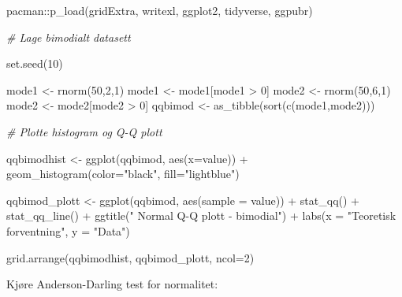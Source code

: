 \documentclass[
]{book}
\newenvironment{Shaded}{\begin{snugshade}}{\end{snugshade}}
\newcommand{\AttributeTok}[1]{\textcolor[rgb]{0.77,0.63,0.00}{#1}}
\newcommand{\CommentTok}[1]{\textcolor[rgb]{0.56,0.35,0.01}{\textit{#1}}}
\newcommand{\DecValTok}[1]{\textcolor[rgb]{0.00,0.00,0.81}{#1}}
\newcommand{\FunctionTok}[1]{\textcolor[rgb]{0.00,0.00,0.00}{#1}}
\newcommand{\NormalTok}[1]{#1}
\newcommand{\OtherTok}[1]{\textcolor[rgb]{0.56,0.35,0.01}{#1}}
\newcommand{\SpecialCharTok}[1]{\textcolor[rgb]{0.00,0.00,0.00}{#1}}
\newcommand{\StringTok}[1]{\textcolor[rgb]{0.31,0.60,0.02}{#1}}
\begin{document}
\begin{Shaded}
\begin{Highlighting}[]
\NormalTok{pacman}\SpecialCharTok{::}\FunctionTok{p\_load}\NormalTok{(gridExtra, writexl, ggplot2, tidyverse, ggpubr)}

\CommentTok{\# Lage bimodialt datasett}

\FunctionTok{set.seed}\NormalTok{(}\DecValTok{10}\NormalTok{) }

\NormalTok{mode1 }\OtherTok{\textless{}{-}} \FunctionTok{rnorm}\NormalTok{(}\DecValTok{50}\NormalTok{,}\DecValTok{2}\NormalTok{,}\DecValTok{1}\NormalTok{)}
\NormalTok{mode1 }\OtherTok{\textless{}{-}}\NormalTok{ mode1[mode1 }\SpecialCharTok{\textgreater{}} \DecValTok{0}\NormalTok{] }
\NormalTok{mode2 }\OtherTok{\textless{}{-}} \FunctionTok{rnorm}\NormalTok{(}\DecValTok{50}\NormalTok{,}\DecValTok{6}\NormalTok{,}\DecValTok{1}\NormalTok{)}
\NormalTok{mode2 }\OtherTok{\textless{}{-}}\NormalTok{ mode2[mode2 }\SpecialCharTok{\textgreater{}} \DecValTok{0}\NormalTok{] }
\NormalTok{qqbimod }\OtherTok{\textless{}{-}} \FunctionTok{as\_tibble}\NormalTok{(}\FunctionTok{sort}\NormalTok{(}\FunctionTok{c}\NormalTok{(mode1,mode2)))}

\CommentTok{\# Plotte histogram og Q{-}Q plott}

\NormalTok{qqbimodhist }\OtherTok{\textless{}{-}} \FunctionTok{ggplot}\NormalTok{(qqbimod, }\FunctionTok{aes}\NormalTok{(}\AttributeTok{x=}\NormalTok{value)) }\SpecialCharTok{+} \FunctionTok{geom\_histogram}\NormalTok{(}\AttributeTok{color=}\StringTok{"black"}\NormalTok{, }\AttributeTok{fill=}\StringTok{"lightblue"}\NormalTok{)}

\NormalTok{qqbimod\_plott }\OtherTok{\textless{}{-}} \FunctionTok{ggplot}\NormalTok{(qqbimod, }\FunctionTok{aes}\NormalTok{(}\AttributeTok{sample =}\NormalTok{ value)) }\SpecialCharTok{+}
  \FunctionTok{stat\_qq}\NormalTok{() }\SpecialCharTok{+}
  \FunctionTok{stat\_qq\_line}\NormalTok{() }\SpecialCharTok{+}
  \FunctionTok{ggtitle}\NormalTok{(}\StringTok{" Normal Q{-}Q plott {-} bimodial"}\NormalTok{) }\SpecialCharTok{+} \FunctionTok{labs}\NormalTok{(}\AttributeTok{x =} \StringTok{"Teoretisk forventning"}\NormalTok{, }\AttributeTok{y =} \StringTok{"Data"}\NormalTok{)}

\FunctionTok{grid.arrange}\NormalTok{(qqbimodhist, qqbimod\_plott, }\AttributeTok{ncol=}\DecValTok{2}\NormalTok{)}
\end{Highlighting}
\end{Shaded}

Kjøre Anderson-Darling test for normalitet:
\end{document}
